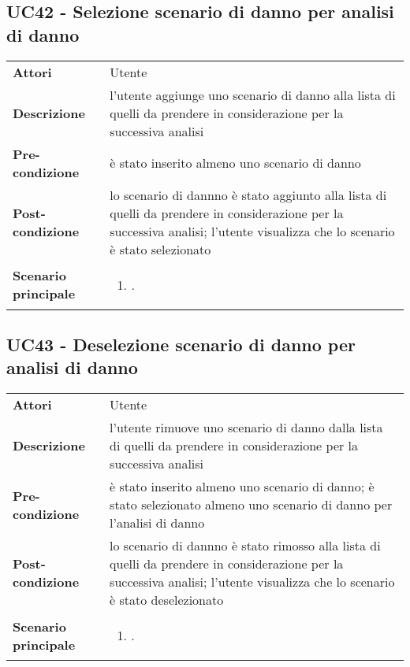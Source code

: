 \subsection{UC42 - Selezione scenario di danno per analisi di danno} 
\label{sssec:UC42} 
\def\arraystretch{1.5}
\begin{tabularx}{\textwidth}{l|p{}}
	\rowcolor{I} \multicolumn{2}{c}{\color{white}\textbf{UC42 - Selezione scenario di danno per analisi di danno}} \\
	\toprule
	\endhead
	\textbf{Attori} & Utente\\
	\textbf{Descrizione} & l'utente aggiunge uno scenario di danno alla lista di quelli da prendere in considerazione per la successiva analisi\\
	\textbf{Pre-condizione} & è stato inserito almeno uno scenario di danno\\
	\textbf{Post-condizione} & lo scenario di dannno è stato aggiunto alla lista di quelli da prendere in considerazione per la successiva analisi; l'utente visualizza che lo scenario è stato selezionato \\
	\textbf{Scenario principale} & \vspace{-1.2em}\begin{enumerate}[leftmargin=*,noitemsep,nosep]
		\item \nameref{sssec:UC42}.
	\end{enumerate}\\
	\bottomrule
\end{tabularx}
\subsection{UC43 - Deselezione scenario di danno per analisi di danno} 
\label{sssec:UC43} 
\def\arraystretch{1.5}
\begin{tabularx}{\textwidth}{l|p{}}
	\rowcolor{I} \multicolumn{2}{c}{\color{white}\textbf{UC43 - Deselezione scenario di danno per analisi di danno}} \\
	\toprule
	\endhead
	\textbf{Attori} & Utente\\
	\textbf{Descrizione} & l'utente rimuove uno scenario di danno dalla lista di quelli da prendere in considerazione per la successiva analisi\\
	\textbf{Pre-condizione} & è stato inserito almeno uno scenario di danno; è stato selezionato almeno uno scenario di danno per l'analisi di danno\\
	\textbf{Post-condizione} & lo scenario di dannno è stato rimosso alla lista di quelli da prendere in considerazione per la successiva analisi; l'utente visualizza che lo scenario è stato deselezionato \\
	\textbf{Scenario principale} & \vspace{-1.2em}\begin{enumerate}[leftmargin=*,noitemsep,nosep]
		\item \nameref{sssec:UC43}.
	\end{enumerate}\\
	\bottomrule
\end{tabularx}
